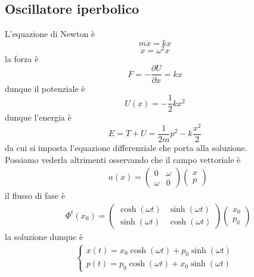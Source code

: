 \documentclass[
10pt, %
a4paper, %
oneside, %
headinclude,footinclude, %
BCOR5mm, %
]{scrartcl}
\begin{document}
\subsection{Oscillatore iperbolico}
L'equazione di Newton è 
\[m\ddot{x} = k x\]
\[\ddot{x} = \omega^2 x\]
la forza è 
\[F = -\frac{\partial U}{\partial x} = kx\]
dunque il potenziale è
\[U(x) = -\frac{1}{2}kx^2\]
dunque l'energia è
\[E = T+U =\frac{1}{2m}p^2- k\frac{x^2}{2}\]
da cui si imposta l'equazione differenziale che porta alla soluzione.\\
Possiamo vederla altrimenti osservando che il campo vettoriale è
\begin{align*}
	&a(x) = 
	\begin{pmatrix}
		0&\omega\\
		\omega&0
	\end{pmatrix}
	\begin{pmatrix}
		x\\
		p
	\end{pmatrix}
\end{align*}
il flusso di fase è 
\begin{align*}
	&\Phi^t(x_0) = 
	\begin{pmatrix}
		\cosh(\omega t)&\sinh(\omega t)\\
		\sinh(\omega t)&\cosh(\omega t)
	\end{pmatrix}
	\begin{pmatrix}
		x_0\\
		p_0
	\end{pmatrix}
\end{align*}
la soluzione dunque è
\begin{align*}
	\begin{cases}
		x(t) = x_0\cosh(\omega t)+p_0\sinh(\omega t)\\
		p(t) = p_0\cosh(\omega t)+x_0\sinh(\omega t)
	\end{cases}
\end{align*}
\end{document}
